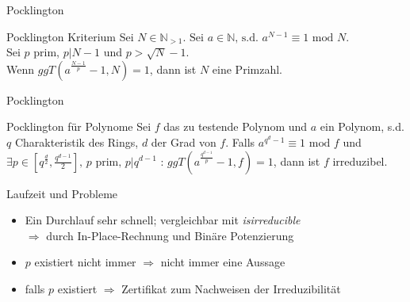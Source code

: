 \documentclass[german,10pt,xcolor=colortbl,compress]{beamer}%
\newcommand{\NN}{\mathbb{N}}
\begin{document}
	
	\begin{frame}{Pocklington}
		\begin{block}{Pocklington Kriterium}
			Sei $N\in \NN_{>1}$. $%
			\text{Sei } a \in \NN \text{, s.d. } a^{N-1} \equiv 1 \text{ mod } N$.\\
			Sei $p$ prim, $p | N-1$ und $p> \sqrt{N}-1$.\\
			Wenn $ggT(a^{\frac{N-1}{p}}-1,N) = 1$, dann ist $N$ eine Primzahl.
		\end{block}
	\end{frame}

		
	\begin{frame}{Pocklington}
		\begin{block}{Pocklington für Polynome}
			Sei $f$ das zu testende Polynom und $a$ ein Polynom, s.d. 
			$q$ Charakteristik des Rings, $d$ der Grad von $f$.
			Falls $a^{q^{d}-1}\equiv 1 \text{ mod }f$ und 
			$\exists p \in [q^{\frac{d}{2}}, \frac{q^{d-1}}{2}]\text{, } p \text{ prim, } p|q^{d-1} $ : $ggT(a^{\frac{q^{d-1}}{p}}-1, f)=1$, dann ist $f$ irreduzibel. 
		\end{block}
	
	\end{frame}


	\begin{frame}{Laufzeit und Probleme}
		\begin{itemize}
		\item Ein Durchlauf sehr schnell; vergleichbar mit \textit{isirreducible} \\
		$\Rightarrow$ durch In-Place-Rechnung und Binäre Potenzierung
		
		\item $p$ existiert nicht immer $\Rightarrow$ nicht immer eine Aussage
		\item falls $p$ existiert $\Rightarrow$ Zertifikat zum Nachweisen der Irreduzibilität 
		\end{itemize}	
		
	\end{frame}
\end{document}
